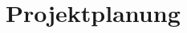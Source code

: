 \documentclass[
    headings=optiontotocandhead,%
    twoside,
    numbers=noenddot,%
    toc=flat, %
    12pt, %
    titlepage, %
    parskip=full, %
    listof=totoc, %
    listof=flat, %
    numbers=noenddot, %
    bibliography=totoc, %
    a4paper,DIV=14,
    BCOR=15mm,
]{scrbook}
\begin{document}






%





%

%

%


\chapter{Projektplanung}
\renewcommand{\kapitelautor}{Autor: Rafael Doja}

\end{document}
